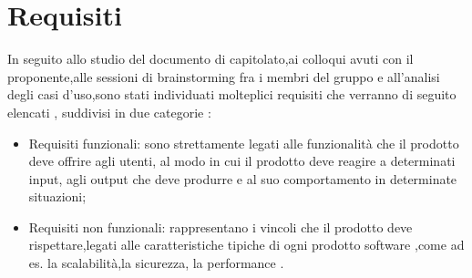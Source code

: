 \section{Requisiti}
In seguito allo studio del documento di capitolato,ai colloqui avuti con il proponente,alle sessioni di 
brainstorming fra i membri del gruppo e all'analisi degli casi d'uso,sono stati individuati molteplici requisiti 
che verranno di seguito elencati , suddivisi in due categorie :
\begin{itemize}
    \item Requisiti funzionali: sono strettamente legati alle funzionalità che il prodotto deve offrire agli utenti,
    al modo in cui il prodotto deve reagire a determinati input, agli output che deve produrre e al suo comportamento in determinate situazioni;
    \item Requisiti non funzionali: rappresentano i vincoli che il prodotto deve rispettare,legati alle caratteristiche tipiche di
    ogni prodotto software ,come ad es. la scalabilità,la sicurezza, la performance .
\end{itemize}
